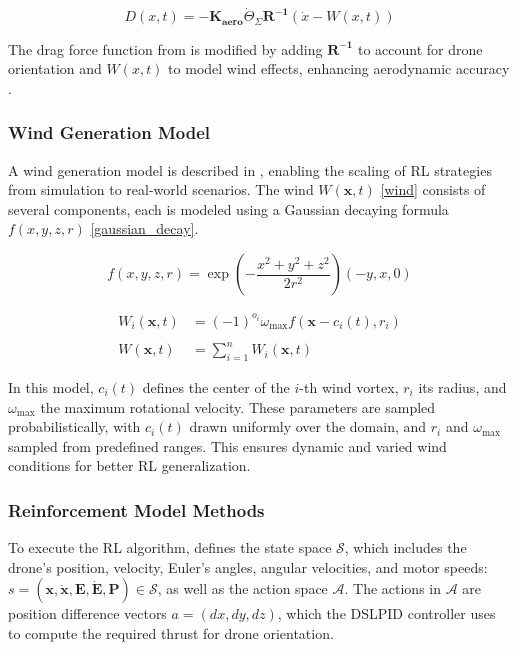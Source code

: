 \documentclass[10pt,journal,compsoc]{IEEEtran}
\begin{document}
\begin{equation}\label{drag_function}
    D(x,t) = -\mathbf{K_{\text{aero}}}\dot{\Theta}_{\Sigma}\mathbf{R^{-1}}(\dot{x}-W(x,t))
\end{equation}

 The drag force function from \cite{Forster} is modified by adding $\mathbf{R^{-1}}$ to account for drone orientation and $W(x,t)$ to model wind effects, enhancing aerodynamic accuracy \cite{studied}.

\subsubsection{Wind Generation Model}

A wind generation model is described in \cite{studied}, enabling the scaling of RL strategies from simulation to real-world scenarios. The wind $W(\mathbf{x},t)$ \eqref{wind} consists of several components, each is modeled using a Gaussian decaying formula $f(x,y,z,r)$ \eqref{gaussian_decay}.

\begin{equation}\label{gaussian_decay}
    f(x,y,z,r)= \exp\left(-\frac{x^2 + y^2 + z^2}{2r^2}\right) (-y, x, 0)
\end{equation}

\begin{equation}\label{wind}
\begin{aligned}
    W_i(\mathbf{x},t) &= (-1)^{o_i} \omega_{\text{max}} f(\mathbf{x}- c_i(t), r_i) \\\\
    W(\mathbf{x},t) &= \sum_{i=1}^{n} W_i(\mathbf{x},t)
\end{aligned}    
\end{equation}

In this model, $c_i(t)$ defines the center of the $i$-th wind vortex, $r_i$ its radius, and $\omega_{\text{max}}$ the maximum rotational velocity. These parameters are sampled probabilistically, with $c_i(t)$ drawn uniformly over the domain, and $r_i$ and $\omega_{\text{max}}$ sampled from predefined ranges. This ensures dynamic and varied wind conditions for better RL generalization.

\subsubsection{Reinforcement Model Methods}
To execute the RL algorithm, \cite{studied} defines the state space $\mathcal{S}$, which includes the drone's position, velocity, Euler's angles, angular velocities, and motor speeds: $s = \mathbf{(x, \dot{x}, E, \dot{E}, P)} \in \mathcal{S}$, as well as the action space $\mathcal{A}$. The actions in $\mathcal{A}$ are position difference vectors $a = (dx, dy, dz)$, which the DSLPID controller \cite{55} uses to compute the required thrust for drone orientation.
\end{document}

